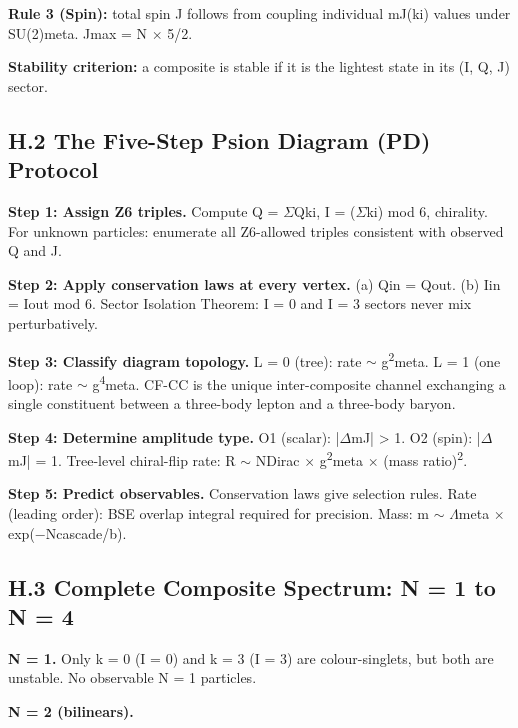 \documentclass[11pt,letterpaper]{article}
\begin{document}
\noindent \textbf{Rule 3 (Spin): }total spin J follows from coupling individual mJ(ki) values under SU(2)meta. Jmax = N $\times$ 5/2.

\noindent \textbf{Stability criterion: }a composite is stable if it is the lightest state in its (I, Q, J) sector.

\subsection*{H.2  The Five-Step Psion Diagram (PD) Protocol}

\noindent \textbf{Step 1: Assign Z6 triples. }Compute Q = $\Sigma$Qki, I = ($\Sigma$ki) mod 6, chirality. For unknown particles: enumerate all Z6-allowed triples consistent with observed Q and J.

\noindent \textbf{Step 2: Apply conservation laws at every vertex. }(a) Qin = Qout. (b) Iin = Iout mod 6. Sector Isolation Theorem: I = 0 and I = 3 sectors never mix perturbatively.

\noindent \textbf{Step 3: Classify diagram topology. }L = 0 (tree): rate $\sim$ g\textsuperscript{2}meta. L = 1 (one loop): rate $\sim$ g\textsuperscript{4}meta. CF-CC is the unique inter-composite channel exchanging a single constituent between a three-body lepton and a three-body baryon.

\noindent \textbf{Step 4: Determine amplitude type. }O1 (scalar): |$\Delta$mJ| > 1. O2 (spin): |$\Delta$mJ| = 1. Tree-level chiral-flip rate: R $\sim$ NDirac $\times$ g\textsuperscript{2}meta $\times$ (mass ratio)\textsuperscript{2}.

\noindent \textbf{Step 5: Predict observables. }Conservation laws give selection rules. Rate (leading order): BSE overlap integral required for precision. Mass: m $\sim$ $\Lambda$meta $\times$ exp($-$Ncascade/b).

\subsection*{H.3  Complete Composite Spectrum: N = 1 to N = 4}

\noindent \textbf{N = 1. }Only k = 0 (I = 0) and k = 3 (I = 3) are colour-singlets, but both are unstable. No observable N = 1 particles.

\noindent \textbf{N = 2 (bilinears).}
\end{document}

